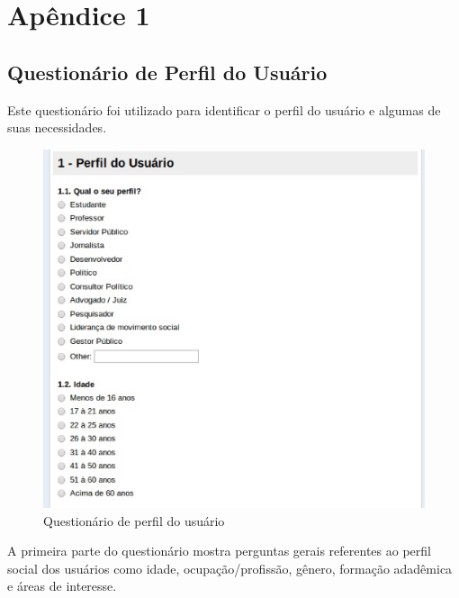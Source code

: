 \newpage
\appendix
\chapter{Apêndice 1}
\section{Questionário de Perfil do Usuário}

	Este questionário foi utilizado para identificar o perfil do usuário e algumas de suas necessidades. 




\begin{figure}[h]
    \centering
    \includegraphics[keepaspectratio=true,scale=0.60]
      {figuras/perf1.eps}
	\caption{Questionário de perfil do usuário}
    \label{perfilgeral}
\end{figure}
%
%
\newpage


A primeira parte do questionário mostra perguntas gerais referentes ao perfil social dos usuários como idade, ocupação/profissão, gênero, formação adadêmica e áreas de interesse.



